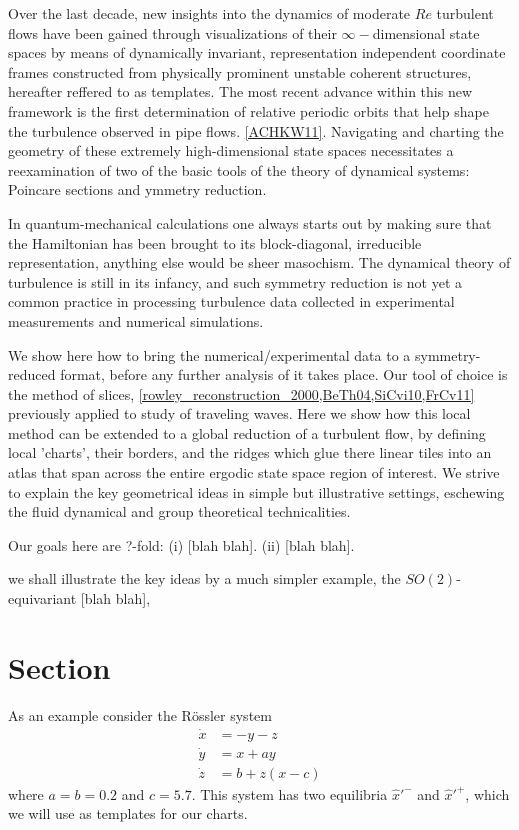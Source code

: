 \documentclass{article}
\begin{document}
Over the last decade, new insights into the dynamics of moderate $Re$ turbulent flows have been gained through visualizations of their $\infty-$dimensional state spaces by means of dynamically invariant, representation independent coordinate frames constructed from physically prominent unstable coherent structures, hereafter reffered to as templates. The most recent advance within this new framework is the first determination of relative periodic orbits that help shape the turbulence observed in pipe flows. \ref{ACHKW11}. Navigating and charting the geometry of these extremely high-dimensional state spaces necessitates a reexamination of two of the basic tools of the theory of dynamical systems: Poincare sections and ymmetry reduction.

In quantum-mechanical calculations one always starts out by making sure that the Hamiltonian has been brought to its block-diagonal, irreducible representation, anything else would be sheer masochism. The dynamical theory of turbulence is still in its infancy, and such symmetry reduction is not yet a common practice in processing turbulence data collected in experimental measurements and numerical simulations.

We show here how to bring the numerical/experimental data to a symmetry-reduced format, before any further analysis of it takes place. Our tool of choice is the method of slices, \ref{rowley_reconstruction_2000,BeTh04,SiCvi10,FrCv11} previously applied to study of traveling waves. Here we show how this local method can be extended to a global reduction of a turbulent flow, by defining local 'charts', their borders, and the ridges which glue there linear tiles into an atlas that span across the entire ergodic state space region of interest. We strive to explain the key geometrical ideas in simple but illustrative settings, eschewing the fluid dynamical and group theoretical technicalities.

Our goals here are ?-fold:
(i)  [blah blah].
(ii) [blah blah].

we shall illustrate the key ideas by a much
simpler example, the $SO(2)$-equivariant  [blah blah],

\section{Section}
\label{s:cut}


As an example consider the R\"ossler system
\begin{align}
\dot{x}&=-y-z\\
\dot{y}&=x+ay\\
\dot{z}&=b+z(x-c)
\end{align}
where $a=b=0.2$ and $c=5.7$. This system has two equilibria $\hat{x}'^{-}$ and $\hat{x}'^{+}$, which we will use as templates for our charts.
\end{document}
